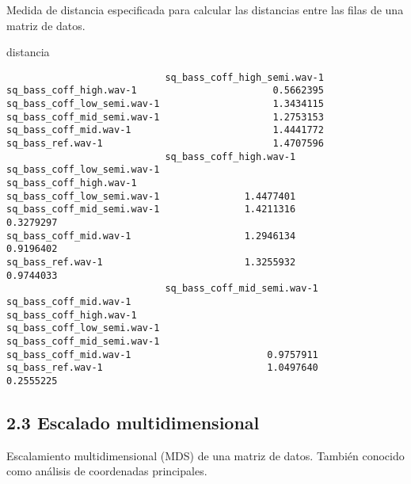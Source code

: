 \documentclass[
]{article}
\newenvironment{Shaded}{\begin{snugshade}}{\end{snugshade}}
\newcommand{\FunctionTok}[1]{\textcolor[rgb]{0.00,0.00,0.00}{#1}}
\newcommand{\NormalTok}[1]{#1}
\newcommand{\OtherTok}[1]{\textcolor[rgb]{0.56,0.35,0.01}{#1}}
\newcommand{\SpecialCharTok}[1]{\textcolor[rgb]{0.00,0.00,0.00}{#1}}
\begin{document}
Medida de distancia especificada para calcular las distancias entre las
filas de una matriz de datos.

\begin{Shaded}
\begin{Highlighting}[]
\NormalTok{distancia}
\end{Highlighting}
\end{Shaded}

\begin{verbatim}
                            sq_bass_coff_high_semi.wav-1
sq_bass_coff_high.wav-1                        0.5662395
sq_bass_coff_low_semi.wav-1                    1.3434115
sq_bass_coff_mid_semi.wav-1                    1.2753153
sq_bass_coff_mid.wav-1                         1.4441772
sq_bass_ref.wav-1                              1.4707596
                            sq_bass_coff_high.wav-1 sq_bass_coff_low_semi.wav-1
sq_bass_coff_high.wav-1                                                        
sq_bass_coff_low_semi.wav-1               1.4477401                            
sq_bass_coff_mid_semi.wav-1               1.4211316                   0.3279297
sq_bass_coff_mid.wav-1                    1.2946134                   0.9196402
sq_bass_ref.wav-1                         1.3255932                   0.9744033
                            sq_bass_coff_mid_semi.wav-1 sq_bass_coff_mid.wav-1
sq_bass_coff_high.wav-1                                                       
sq_bass_coff_low_semi.wav-1                                                   
sq_bass_coff_mid_semi.wav-1                                                   
sq_bass_coff_mid.wav-1                        0.9757911                       
sq_bass_ref.wav-1                             1.0497640              0.2555225
\end{verbatim}

\hypertarget{escalado-multidimensional}{%
\subsection{2.3 Escalado
multidimensional}\label{escalado-multidimensional}}

Escalamiento multidimensional (MDS) de una matriz de datos. También
conocido como análisis de coordenadas principales.

\begin{Shaded}
\end{Shaded}
\end{document}
